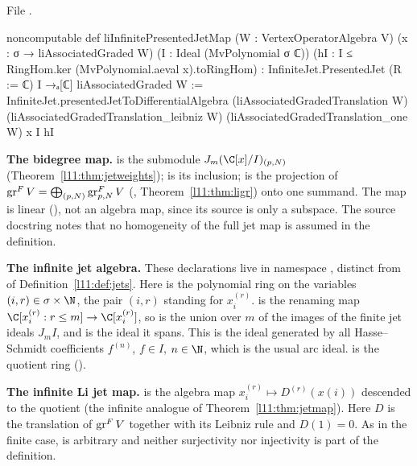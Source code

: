 \noindent File .
\begin{leancode}
noncomputable def liInfinitePresentedJetMap (W : VertexOperatorAlgebra V)
    (x : σ → liAssociatedGraded W) (I : Ideal (MvPolynomial σ ℂ))
    (hI : I ≤ RingHom.ker (MvPolynomial.aeval x).toRingHom) :
    InfiniteJet.PresentedJet (R := ℂ) I →ₐ[ℂ] liAssociatedGraded W :=
  InfiniteJet.presentedJetToDifferentialAlgebra (liAssociatedGradedTranslation W)
    (liAssociatedGradedTranslation_leibniz W) (liAssociatedGradedTranslation_one W) x I hI
\end{leancode}

\begin{dictionary}
\textbf{The bidegree map.}  is the submodule
$J_m(\C[x]/I)_{(p,N)}$ (Theorem~\ref{l11:thm:jetweights});  is its inclusion;
 is the projection of $\operatorname{gr}^FV = \bigoplus_{(p,N)}\operatorname{gr}^F_{p,N}V$
(, Theorem~\ref{l11:thm:ligr}) onto one summand. The map is linear (), not an algebra map,
since its source is only a subspace. The source docstring notes that no homogeneity of the full jet map is assumed in
the definition.

\textbf{The infinite jet algebra.} These declarations live in namespace , distinct from
 of Definition~\ref{l11:def:jets}. Here  is the polynomial ring on the variables
$(i,r)\in\sigma\times\N$, the pair $(i,r)$ standing for $x_i^{(r)}$.  is the renaming map
$\C[x_i^{(r)}:r\le m]\to\C[x_i^{(r)}]$, so  is the union over $m$ of the images of the finite jet ideals
$J_mI$, and  is the ideal it spans. This is the ideal generated by all Hasse--Schmidt coefficients
$f^{(n)}$, $f\in I$, $n\in\N$, which is the usual arc ideal.  is the quotient ring ().

\textbf{The infinite Li jet map.}  is the algebra map
$x_i^{(r)}\mapsto D^{(r)}(x(i))$ descended to the quotient (the infinite analogue of Theorem~\ref{l11:thm:jetmap}). Here
$D$ is the translation of $\operatorname{gr}^FV$ together with its Leibniz rule and $D(1)=0$. As in the finite case,  is
arbitrary and neither surjectivity nor injectivity is part of the definition.
\end{dictionary}


